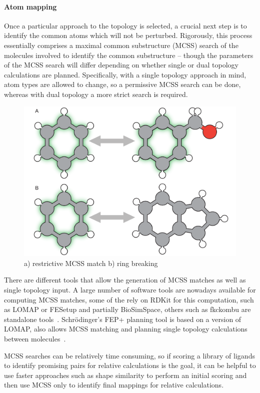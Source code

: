 \documentclass[9pt,bestpractices]{livecoms}
\begin{document}
\paragraph{Atom mapping}
Once a particular approach to the topology is selected, a crucial next step is to identify the common atoms which will not be perturbed.
Rigorously, this process essentially comprises a maximal common substructure (MCSS) search of the molecules involved to identify the common substructure -- though the parameters of the MCSS search will differ depending on whether single or dual topology calculations are planned.
Specifically, with a single topology approach in mind, atom types are allowed to change, so a permissive MCSS search can be done, whereas with dual topology a more strict search is required.
\begin{figure}
    \includegraphics[width=0.95\linewidth]{paper/figures/fig5/MCS.pdf}
    \caption{a) restrictive MCSS match b) ring breaking}
    \label{fig:mcss}
\end{figure} 

There are different tools that allow the generation of MCSS matches as well as single topology input. A large number of software tools are nowadays available for computing MCSS matches, some of the rely on RDKit for this computation, such as LOMAP or FESetup and partially BioSimSpace, others such as fkckombu are standalone tools~\cite{rdkit, lomap, fesetup, biosimspace, fkcombu}. Schr\"{o}dinger's FEP+ planning tool is based on a version of LOMAP, also allows MCSS matching and planning single topology calculations between molecules~\cite{FEP+}. 

MCSS searches can be relatively time consuming, so if scoring a library of ligands to identify promising pairs for relative calculations is the goal, it can be helpful to use faster approaches such as shape similarity to perform an initial scoring and then use MCSS only to identify final mappings for relative calculations.
\end{document}
